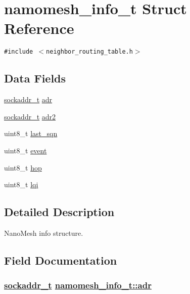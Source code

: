\hypertarget{structnamomesh__info__t}{
\section{namomesh\_\-info\_\-t Struct Reference}
\label{structnamomesh__info__t}
}
{\tt \#include $<$neighbor\_\-routing\_\-table.h$>$}

\subsection*{Data Fields}
\begin{CompactItemize}
\item 
\hyperlink{structsockaddr__t}{sockaddr\_\-t} \hyperlink{structnamomesh__info__t_5b1d28952344f0ab564ef2f6ed12d417}{adr}
\item 
\hyperlink{structsockaddr__t}{sockaddr\_\-t} \hyperlink{structnamomesh__info__t_628dc59b37e2188905a49208b5678924}{adr2}
\item 
uint8\_\-t \hyperlink{structnamomesh__info__t_01660e69d510cbfaf227a561710be004}{last\_\-sqn}
\item 
uint8\_\-t \hyperlink{structnamomesh__info__t_0c48ca38620172086d488437fe8c3c0e}{event}
\item 
uint8\_\-t \hyperlink{structnamomesh__info__t_0ada1dc9dbe42d9c5a781c35dc1dd4d7}{hop}
\item 
uint8\_\-t \hyperlink{structnamomesh__info__t_f66923fa4678f0ce0c73ee72c3550bcd}{lqi}
\end{CompactItemize}


\subsection{Detailed Description}
Nano\-Mesh info structure. 



\subsection{Field Documentation}
\hypertarget{structnamomesh__info__t_5b1d28952344f0ab564ef2f6ed12d417}{
\subsubsection[adr]{\setlength{\rightskip}{0pt plus 5cm}\hyperlink{structsockaddr__t}{sockaddr\_\-t} \hyperlink{structnamomesh__info__t_5b1d28952344f0ab564ef2f6ed12d417}{namomesh\_\-info\_\-t::adr}}}
\label{structnamomesh__info__t_5b1d28952344f0ab564ef2f6ed12d417}


